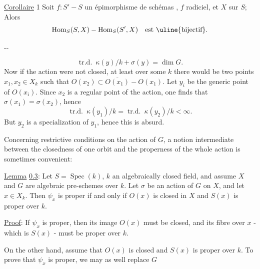 \uline{Corollaire} 1 Soit $f:S'\mathbin{-}S$ un épimorphisme de schémas , $f$   radiciel, et $X$   sur $S$;   Alors
\[
\operatorname{Hom}_S(S,X)\mathbin{-}\operatorname{Hom}_S(S',X)\quad\text{est \uline{bijectif}}.
\]

\begin{center}--\end{center}
\[
\operatorname{tr.d.}\ \kappa(y)/k+\sigma(y)=\dim G.
\]
Now if the action were not closed, at least over some $k$ there would be two points $x_1,x_2\in X_k$ such that $O(x_2)\subset\overline{O(x_1)}-O(x_1)$. Let $y_i$ be the generic point of $O(x_i)$. Since $x_2$ is a regular point of the action, one finds that $\sigma(x_1)=\sigma(x_2)$, hence
\[
\operatorname{tr.d.}\ \kappa(y_1)/k=\operatorname{tr.d.}\ \kappa(y_2)/k<\infty.
\]
But $y_2$ is a specialization of $y_1$, hence this is absurd.

Concerning restrictive conditions on the action of $G$, a notion intermediate between the closedness of one orbit and the properness of the whole action is sometimes convenient:

\uline{Lemma} \uline{0.3}: Let $S=\operatorname{Spec}(k)$, $k$ an algebraically closed field, and assume $X$ and $G$ are algebraic pre-schemes over $k$. Let $\sigma$ be an action of $G$ on $X$, and let $x\in X_k$. Then $\psi_x$ is proper if and only if $O(x)$ is closed in $X$ and $S(x)$ is proper over $k$.

\uline{Proof}: If $\psi_x$ is proper, then its image $O(x)$ must be closed, and its fibre over $x$ - which is $S(x)$ - must be proper over $k$.

On the other hand, assume that $O(x)$ is closed and $S(x)$ is proper over $k$. To prove that $\psi_x$ is proper, we may as well replace $G$


